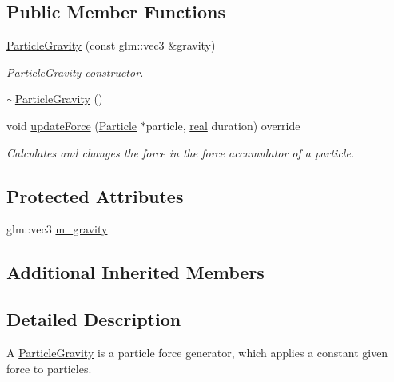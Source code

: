 \subsection*{Public Member Functions}
\begin{DoxyCompactItemize}
\item 
\mbox{\hyperlink{classr3_1_1_particle_gravity_a698440df6351766d4c5c3c7704bdead6}{Particle\+Gravity}} (const glm\+::vec3 \&gravity)
\begin{DoxyCompactList}\small\item\em \mbox{\hyperlink{classr3_1_1_particle_gravity}{Particle\+Gravity}} constructor. \end{DoxyCompactList}\item 
\mbox{\hyperlink{classr3_1_1_particle_gravity_a7130786765cc4befe6808a70254871bc}{$\sim$\+Particle\+Gravity}} ()
\item 
void \mbox{\hyperlink{classr3_1_1_particle_gravity_a9535686bf25375d94bbe0451c089b788}{update\+Force}} (\mbox{\hyperlink{classr3_1_1_particle}{Particle}} $\ast$particle, \mbox{\hyperlink{namespacer3_ab2016b3e3f743fb735afce242f0dc1eb}{real}} duration) override
\begin{DoxyCompactList}\small\item\em Calculates and changes the force in the force accumulator of a particle. \end{DoxyCompactList}\end{DoxyCompactItemize}
\subsection*{Protected Attributes}
\begin{DoxyCompactItemize}
\item 
glm\+::vec3 \mbox{\hyperlink{classr3_1_1_particle_gravity_a4e21b444ed08aa8c66ca40a11f34c384}{m\+\_\+gravity}}
\end{DoxyCompactItemize}
\subsection*{Additional Inherited Members}


\subsection{Detailed Description}
A \mbox{\hyperlink{classr3_1_1_particle_gravity}{Particle\+Gravity}} is a particle force generator, which applies a constant given force to particles. 


